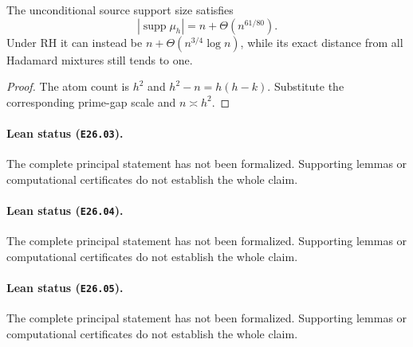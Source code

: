 \begin{corollary}
\label{s26:cor:stability-support-excess}
The unconditional source support size satisfies
\[
 |\operatorname{supp}\mu_h|=n+\Theta(n^{61/80}).
\]
Under RH it can instead be $n+\Theta(n^{3/4}\log n)$, while its exact
distance from all Hadamard mixtures still tends to one.
\end{corollary}
\begin{proof}
The atom count is $h^2$ and $h^2-n=h(h-k)$. Substitute the corresponding
prime-gap scale and $n\asymp h^2$.
\end{proof}


\paragraph{Lean status (\texttt{E26.03}).} The complete principal statement has not been formalized. Supporting lemmas or computational certificates do not establish the whole claim.

\paragraph{Lean status (\texttt{E26.04}).} The complete principal statement has not been formalized. Supporting lemmas or computational certificates do not establish the whole claim.

\paragraph{Lean status (\texttt{E26.05}).} The complete principal statement has not been formalized. Supporting lemmas or computational certificates do not establish the whole claim.
